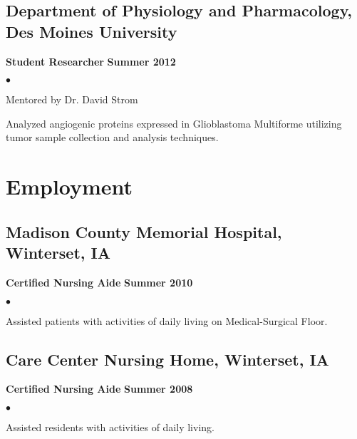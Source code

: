 \documentclass[11pt,letterpaper]{article}
\renewenvironment{itemize}{
  \begin{list}{}{
      \setlength{\leftmargin}{1.5em}
      \setlength{\itemsep}{0.25em}
      \setlength{\parskip}{0pt}
      \setlength{\parsep}{0.25em}
    }
  }{
  \end{list}
}
\newenvironment{bitemize}{
  \begin{list}{$\bullet$}{
      \setlength{\leftmargin}{1.5em}
      \setlength{\itemsep}{0.25em}
      \setlength{\parskip}{0pt}
      \setlength{\parsep}{0.25em}
    }
  }{
  \end{list}
}
\newcommand{\yearrange}[1]{\hfill \textbf{#1} \par}
\begin{document}
\subsection*{Department of Physiology and Pharmacology, Des Moines University}
\begin{itemize}
\item \textbf{Student Researcher} \yearrange{Summer 2012}
  \begin{bitemize}
  \item Mentored by Dr. David Strom
  \item Analyzed angiogenic proteins expressed in Glioblastoma
    Multiforme utilizing tumor sample collection and analysis
    techniques. 
  \end{bitemize}
\end{itemize}


\section*{Employment}

\subsection*{Madison County Memorial Hospital, Winterset, IA}
\begin{itemize}
\item \textbf{Certified Nursing Aide} \yearrange{Summer 2010}
  \begin{bitemize}
    \item Assisted patients with activities of daily living on Medical-Surgical Floor.
  \end{bitemize}
\end{itemize}

\subsection*{Care Center Nursing Home, Winterset, IA}
\begin{itemize}
\item \textbf{Certified Nursing Aide} \yearrange{Summer 2008}
  \begin{bitemize}
    \item Assisted residents with activities of daily living.
  \end{bitemize}
\end{itemize}
\end{document}
